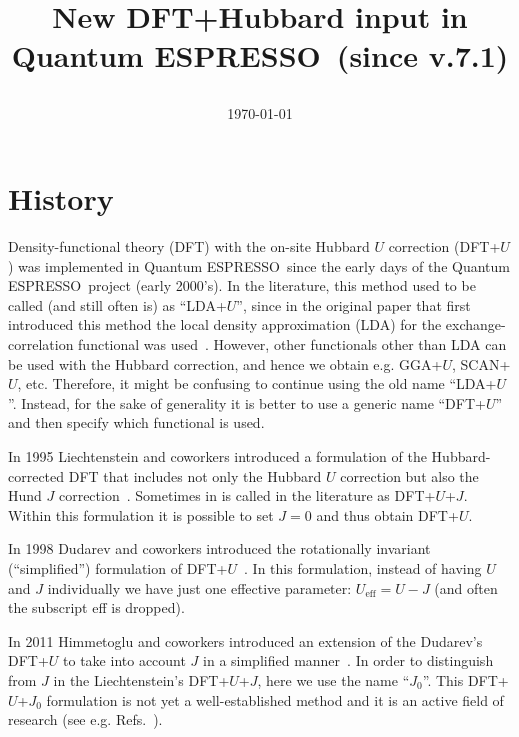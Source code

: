 \documentclass[12pt,a4paper]{article}
\def\version{7.1}
\def\qe{{\sc Quantum ESPRESSO}}
\begin{document}
\author{}
\date{}


\title{
  \Huge New DFT+Hubbard input in \\ \qe\ (since v.\version)
  \date{\today}
}

\maketitle

\tableofcontents

\section{History}
\label{sec:history}

Density-functional theory (DFT) with the on-site Hubbard $U$ correction (DFT+$U$) was implemented in \qe\ since the early days of the \qe\ project (early 2000's). In the literature, this method used to be called (and still often is) as ``LDA+$U$'', since in the original paper that first introduced this method the local density approximation (LDA) for the exchange-correlation functional was used~\cite{Anisimov:1991}. However, other functionals other than LDA can be used with the Hubbard correction, and hence we obtain e.g. GGA+$U$, SCAN+$U$, etc. Therefore, it might be confusing to continue using the old name ``LDA+$U$''. Instead, for the sake of generality it is better to use a generic name ``DFT+$U$'' and then specify which functional is used. 

In 1995 Liechtenstein and coworkers introduced a formulation of the Hubbard-corrected DFT that includes not only the Hubbard $U$ correction but also the Hund $J$ correction~\cite{Liechtenstein:1995}. Sometimes in is called in the literature as DFT+$U$+$J$. Within this formulation it is possible to set $J=0$ and thus obtain DFT+$U$.  

In 1998 Dudarev and coworkers introduced the rotationally invariant (``simplified'') formulation of DFT+$U$~\cite{Dudarev:1998}. In this formulation, instead of having $U$ and $J$ individually we have just one effective parameter: $U_\mathrm{eff} = U - J$ (and often the subscript eff is dropped). 

In 2011 Himmetoglu and coworkers introduced an extension of the Dudarev's DFT+$U$ to take into account $J$ in a simplified manner~\cite{Himmetoglu:2011}. In order to distinguish from $J$ in the Liechtenstein's DFT+$U$+$J$, here we use the name ``$J_0$''. This DFT+$U$+$J_0$ formulation is not yet a well-established method and it is an active field of research (see e.g. Refs.~\cite{Bajaj:2017, Linscott:2018}).
\end{document}
